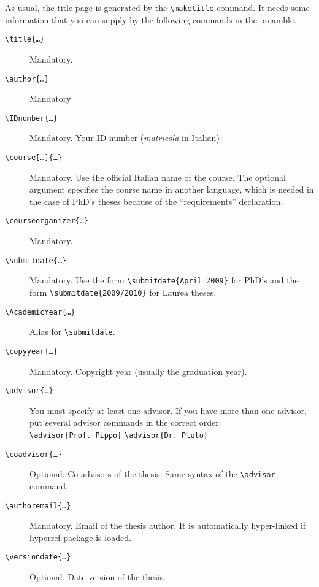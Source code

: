 \documentclass[a5paper,11pt]{article}
\newcommand{\bs}{\textbackslash}
\begin{document}
As usual, the title page is generated by the \texttt{\bs maketitle} command.
It needs some information that you can supply by the following commands
in the preamble.
\begin{description}
\item[\texttt{\bs title\{\dots\}}] Mandatory.

\item[\texttt{\bs author\{\dots\}}] Mandatory

\item[\texttt{\bs IDnumber\{\dots\}}] Mandatory. Your ID number (\textit{matricola} in Italian)

\item[\texttt{\bs course[\dots]\{\dots\}}] Mandatory. Use the official Italian name of the course. The optional argument specifies the course name in another language, which is needed in the case of PhD's theses because of the ``requirements'' declaration.

\item[\texttt{\bs courseorganizer\{\dots\}}] Mandatory.

\item[\texttt{\bs submitdate\{\dots\}}] Mandatory. Use the form \texttt{\bs submitdate\{April 2009\}} for PhD's and the form \texttt{\bs submitdate\{2009/2010\}} for Laurea theses.

\item[\texttt{\bs AcademicYear\{\dots\}}] Alias for \texttt{\bs submitdate}.

\item[\texttt{\bs copyyear\{\dots\}}] Mandatory. Copyright year (usually the 
graduation year). 

\item[\texttt{\bs advisor\{\dots\}}] You must specify at least one advisor.
If you have more than one advisor, put several advisor commands in the correct order:\\
\texttt{\bs advisor\{Prof.~Pippo\}} \texttt{\bs advisor\{Dr.~Pluto\}}

\item[\texttt{\bs coadvisor\{\dots\}}] Optional. Co-advisors of the thesis. 
Same syntax of the \texttt{\bs advisor} command. 

\item[\texttt{\bs authoremail\{\dots\}}] Mandatory. Email of the thesis author.
It is automatically hyper-linked if \textsf{hyperref} package is loaded.

\item[\texttt{\bs versiondate\{\dots\}}] Optional. Date version of the thesis.


\end{description}
\end{document}
